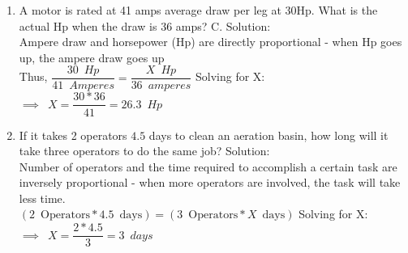 \documentclass{article}
\begin{document}
\begin{enumerate}
\item A motor is rated at 41 amps average draw per leg at $30 \mathrm{Hp}$. What is the actual $\mathrm{Hp}$ when the draw is 36 amps? C. 
\vspace{0.2cm}
Solution:\\
\vspace{0.2cm}
Ampere draw and horsepower (Hp) are directly proportional - when Hp goes up, the ampere draw goes up\\
\vspace{0.2cm}
Thus, $\dfrac{30 \enspace Hp}{41 \enspace Amperes }=\dfrac{X \enspace Hp}{36 \enspace amperes}$
\vspace{0.2cm}
Solving for X:\\
\vspace{0.2cm}
$\implies \enspace X=\dfrac{30*36}{41}=\boxed{26.3 \enspace Hp}$
\vspace{0.2cm}
\item If it takes 2 operators $4.5$ days to clean an aeration basin, how long will it take three operators to do the same job?
\vspace{0.2cm}
Solution:\\
\vspace{0.2cm}
Number of operators and the time required to accomplish a certain task are inversely proportional - when more operators are involved, the task will take less time.\\
\vspace{0.2cm}
$(2 \enspace \mathrm{Operators} * 4.5 \enspace \mathrm{days})=(3 \enspace \mathrm{Operators} * X \enspace \mathrm{days})$
\vspace{0.2cm}
Solving for X:\\
\vspace{0.2cm}
$\implies \enspace X=\dfrac{2*4.5}{3}=\boxed{3 \enspace days}$
\vspace{0.2cm}
\end{enumerate}
\end{document}
